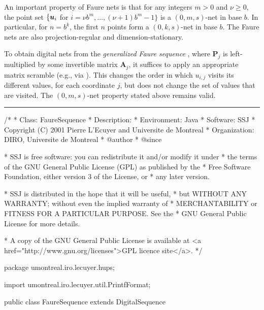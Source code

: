 An important property of Faure nets is that for any integers $m > 0$
and $\nu\ge 0$, the point set
$\{\mbox{\boldmath $u$}_i$ for $i = \nu b^m,\dots, (\nu+1)b^m -1\}$
is a $(0,m,s)$-net in base $b$.
In particular, for $n = b^k$, the first $n$ points form a
 $(0,k,s)$-net in base $b$.
The Faure nets are also projection-regular and dimension-stationary.

To obtain digital nets from the \emph{generalized Faure sequence}
, where $\mathbf{P}_j$ is left-multiplied by some
invertible matrix $\mathbf{A}_j$, it suffices to apply an appropriate
matrix scramble (e.g., via ).
This changes the order in which $u_{i,j}$ visits its different
values, for each coordinate $j$, but does not change the set of values
that are visited.  The $(0,m,s)$-net property stated above remains valid.


\bigskip\hrule\bigskip

\begin{code}
\begin{hide}
/*
 * Class:        FaureSequence
 * Description:  
 * Environment:  Java
 * Software:     SSJ 
 * Copyright (C) 2001  Pierre L'Ecuyer and Universite de Montreal
 * Organization: DIRO, Universite de Montreal
 * @author       
 * @since

 * SSJ is free software: you can redistribute it and/or modify it under
 * the terms of the GNU General Public License (GPL) as published by the
 * Free Software Foundation, either version 3 of the License, or
 * any later version.

 * SSJ is distributed in the hope that it will be useful,
 * but WITHOUT ANY WARRANTY; without even the implied warranty of
 * MERCHANTABILITY or FITNESS FOR A PARTICULAR PURPOSE.  See the
 * GNU General Public License for more details.

 * A copy of the GNU General Public License is available at
   <a href="http://www.gnu.org/licenses">GPL licence site</a>.
 */
\end{hide}
package umontreal.iro.lecuyer.hups;\begin{hide}
import umontreal.iro.lecuyer.util.PrintfFormat;

\end{hide}

public class FaureSequence extends DigitalSequence \begin{hide} {

    // Maximum dimension for the case where b is not specified.
    // Can be extended by extending the precomputed array prime[].
    private static final int MAXDIM = 500;

    // For storing the generator matrices for given dim and numPoints.
    private int[][][] v;
\end{hide}
\end{code}
